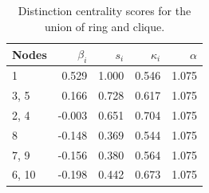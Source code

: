 \begin{table}
\centering
\caption{\label{tab:unionringclique}Distinction centrality scores for the union of ring and clique.}
\centering
\begin{tabular}[t]{lrrrr}
\toprule
Nodes & $\beta_i$ & $s_i$ & $\kappa_i$ & $\alpha$\\
\midrule
1 & 0.529 & 1.000 & 0.546 & 1.075\\
3, 5 & 0.166 & 0.728 & 0.617 & 1.075\\
2, 4 & -0.003 & 0.651 & 0.704 & 1.075\\
8 & -0.148 & 0.369 & 0.544 & 1.075\\
7, 9 & -0.156 & 0.380 & 0.564 & 1.075\\
6, 10 & -0.198 & 0.442 & 0.673 & 1.075\\
\bottomrule
\end{tabular}
\end{table}
